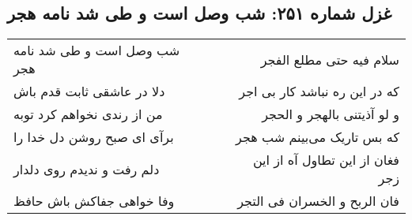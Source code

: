 \begin{center}
\section*{غزل شماره ۲۵۱: شب وصل است و طی شد نامه هجر}
\label{sec:sh251}
\begin{longtable}{l p{0.5cm} r}
شب وصل است و طی شد نامه هجر
&&
سلام فیه حتی مطلع الفجر
\\
دلا در عاشقی ثابت قدم باش
&&
که در این ره نباشد کار بی اجر
\\
من از رندی نخواهم کرد توبه
&&
و لو آذیتنی بالهجر و الحجر
\\
برآی ای صبح روشن دل خدا را
&&
که بس تاریک می‌بینم شب هجر
\\
دلم رفت و ندیدم روی دلدار
&&
فغان از این تطاول آه از این زجر
\\
وفا خواهی جفاکش باش حافظ
&&
فان الربح و الخسران فی التجر
\\
\end{longtable}
\end{center}
